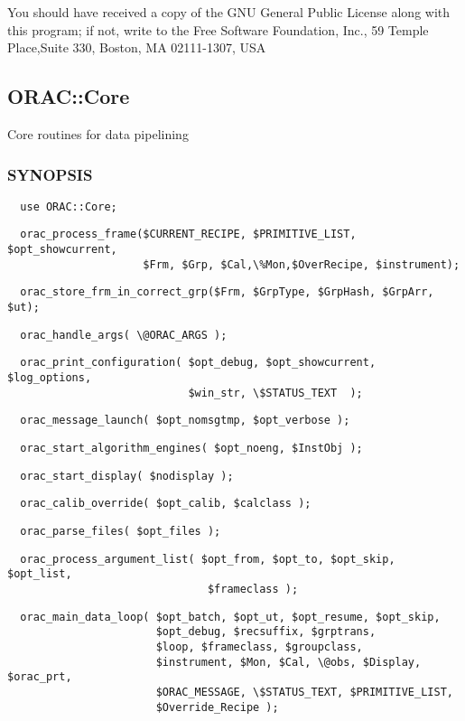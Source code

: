You should have received a copy of the GNU General Public License along with
this program; if not, write to the Free Software Foundation, Inc., 59 Temple
Place,Suite 330, Boston, MA  02111-1307, USA

\subsection{ORAC::Core\label{ORAC::Core}}


Core routines for data pipelining

\subsubsection*{SYNOPSIS\label{ORAC::Core_SYNOPSIS}}
\begin{verbatim}
  use ORAC::Core;
\end{verbatim}
\begin{verbatim}
  orac_process_frame($CURRENT_RECIPE, $PRIMITIVE_LIST, $opt_showcurrent,
                     $Frm, $Grp, $Cal,\%Mon,$OverRecipe, $instrument);
\end{verbatim}
\begin{verbatim}
  orac_store_frm_in_correct_grp($Frm, $GrpType, $GrpHash, $GrpArr, $ut);
\end{verbatim}
\begin{verbatim}
  orac_handle_args( \@ORAC_ARGS );
\end{verbatim}
\begin{verbatim}
  orac_print_configuration( $opt_debug, $opt_showcurrent, $log_options,
                            $win_str, \$STATUS_TEXT  );
\end{verbatim}
\begin{verbatim}
  orac_message_launch( $opt_nomsgtmp, $opt_verbose );
\end{verbatim}
\begin{verbatim}
  orac_start_algorithm_engines( $opt_noeng, $InstObj );
\end{verbatim}
\begin{verbatim}
  orac_start_display( $nodisplay );
\end{verbatim}
\begin{verbatim}
  orac_calib_override( $opt_calib, $calclass );
\end{verbatim}
\begin{verbatim}
  orac_parse_files( $opt_files );
\end{verbatim}
\begin{verbatim}
  orac_process_argument_list( $opt_from, $opt_to, $opt_skip, $opt_list,
                               $frameclass );
\end{verbatim}
\begin{verbatim}
  orac_main_data_loop( $opt_batch, $opt_ut, $opt_resume, $opt_skip, 
                       $opt_debug, $recsuffix, $grptrans,
                       $loop, $frameclass, $groupclass, 
                       $instrument, $Mon, $Cal, \@obs, $Display, $orac_prt,
                       $ORAC_MESSAGE, \$STATUS_TEXT, $PRIMITIVE_LIST,
                       $Override_Recipe );
\end{verbatim}
